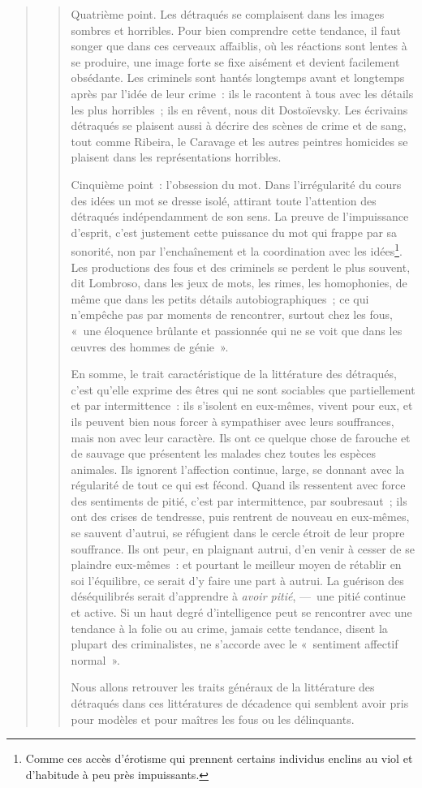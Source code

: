 \documentclass[french,twoside]{book} %
\begin{document}
\begin{verse}
\begin{verse}
\noindent Quatrième point. Les détraqués se complaisent dans les images sombres et horribles. Pour bien comprendre cette tendance, il faut songer que dans ces cerveaux affaiblis, où les réactions sont lentes à se produire, une image forte se fixe aisément et devient facilement obsédante. Les criminels sont hantés longtemps avant et longtemps après par l’idée de leur crime : ils le racontent à tous avec les détails les plus horribles ; ils en rêvent, nous dit Dostoïevsky. Les écrivains détraqués se plaisent aussi à décrire des scènes de crime et de sang, tout comme Ribeira, le Caravage et les autres peintres homicides se plaisent dans les représentations horribles.\par
Cinquième point : l’obsession du mot. Dans l’irrégularité du cours des idées un mot se dresse isolé, attirant toute l’attention des détraqués indépendamment de son sens. La preuve de l’impuissance d’esprit, c’est justement cette puissance du mot qui frappe par sa sonorité, non par l’enchaînement et la coordination avec les idées\footnote{Comme ces accès d’érotisme qui prennent certains individus enclins au viol et d’habitude à peu près impuissants.}. Les productions des fous et des criminels se perdent le plus souvent, dit Lombroso, dans les jeux de mots, les rimes, les homophonies, de même que dans les petits détails autobiographiques ; ce qui n’empêche pas par moments de rencontrer, surtout chez les fous, « une éloquence brûlante et passionnée qui ne se voit que dans les œuvres des hommes de génie ».\par
En somme, le trait caractéristique de la littérature des détraqués, c’est qu’elle exprime des êtres qui ne sont sociables que partiellement et par intermittence : ils s’isolent en eux-mêmes, vivent pour eux, et ils peuvent bien nous forcer à sympathiser avec leurs souffrances, mais non avec leur caractère. Ils ont ce quelque chose de farouche et de sauvage que présentent les malades chez toutes les espèces animales. Ils ignorent l’affection continue, large, se donnant avec la régularité de tout ce qui est fécond. Quand ils ressentent avec force des sentiments de pitié, c’est par intermittence, par soubresaut ; ils ont des crises de tendresse, puis rentrent de nouveau en eux-mêmes, se sauvent d’autrui, se réfugient dans le cercle étroit de leur propre souffrance. Ils ont peur, en plaignant autrui, d’en venir à cesser de se plaindre eux-mêmes : et pourtant le meilleur moyen de rétablir en soi l’équilibre, ce serait d’y faire une part à autrui. La guérison des déséquilibrés serait d’apprendre à \emph{avoir pitié}, — une pitié continue et active. Si un haut degré d’intelligence peut se rencontrer avec une tendance à la folie ou au crime, jamais cette tendance, disent la plupart des criminalistes, ne s’accorde avec le « sentiment affectif normal ».\par
Nous allons retrouver les traits généraux de la littérature des détraqués dans ces littératures de décadence qui semblent avoir pris pour modèles et pour maîtres les fous ou les délinquants.

\end{verse}
\end{verse}
\end{document}
